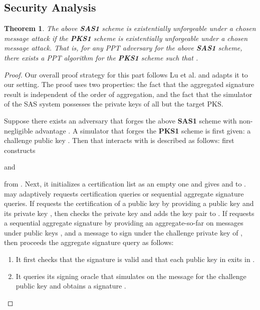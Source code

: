 \documentclass[11pt,letterpaper]{article}
\newtheorem{theorem}{Theorem}[section]
\newcommand{\tb}[1]{\textbf{#1}}
\begin{document}
\subsection{Security Analysis}

\begin{theorem} \label{thm:sas1-prime}
The above \tb{SAS1} scheme is existentially unforgeable under a chosen
message attack if the \tb{PKS1} scheme is existentially unforgeable under a
chosen message attack. That is, for any PPT adversary  for the above
\tb{SAS1} scheme, there exists a PPT algorithm  for the \tb{PKS1}
scheme such that
    .
\end{theorem}

\begin{proof}
Our overall proof strategy for this part follows Lu et al. \cite{LuOSSW06}
and adapts it to our setting. The proof uses two properties: the fact that
the aggregated signature result is independent of the order of aggregation,
and the fact that the simulator of the SAS system possesses the private keys
of all but the target PKS.

Suppose there exists an adversary  that forges the above \tb{SAS1}
scheme with non-negligible advantage . A simulator  that
forges the \tb{PKS1} scheme is first given: a challenge public key
    .
Then  that interacts with  is described as follows:
 first constructs
    
and
    
from . Next, it initializes a certification list  as an empty
one and gives  and  to .
 may adaptively requests certification queries or sequential
aggregate signature queries. If  requests the certification of a
public key by providing a public key 
and its private key , then  checks the
private key and adds the key pair  to .
If  requests a sequential aggregate signature by providing an
aggregate-so-far  on messages  under
public keys , and a message  to
sign under the challenge private key of , then  proceeds the
aggregate signature query as follows:
\begin{enumerate}
\item It first checks that the signature  is valid and that each
    public key in  exits in .

\item It queries its signing oracle that simulates  on
    the message  for the challenge public key  and obtains a
    signature .


\end{enumerate}
\end{proof}
\end{document}
